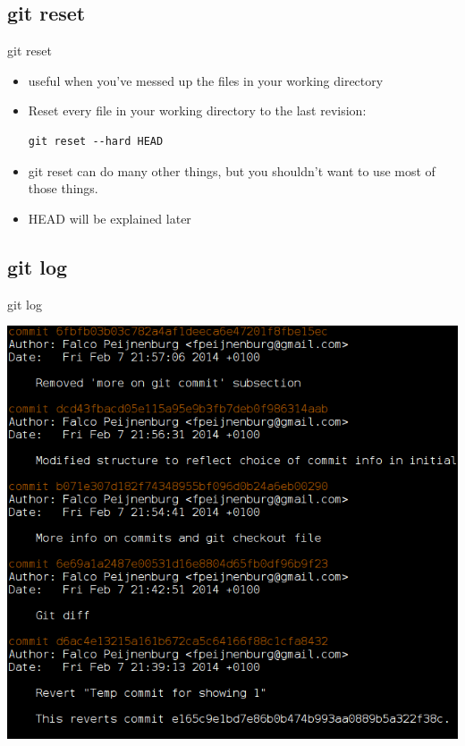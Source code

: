 \documentclass[10pt,a4paper]{beamer}
\begin{document}
\subsection{git reset}
\begin{frame}[fragile]{git reset}
\begin{itemize}
\item useful when you've messed up the files in your working directory
\item Reset every file in your working directory to the last revision:

\begin{verbatim}
git reset --hard HEAD
\end{verbatim}
\item git reset can do many other things, but you shouldn't want to use most of those things.
\item HEAD will be explained later
\end{itemize}
\end{frame}

\subsection{git log}
\begin{frame}
git log \centerline{\includegraphics[width=\textheight]{gitlog.png}}
\end{frame}
\end{document}
